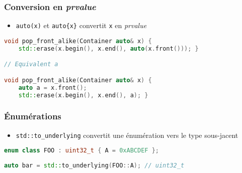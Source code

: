 \documentclass[C++.tex]{subfiles}
\begin{document}
\begin{frame}[fragile]
	\frametitle{Conversion en \textit{prvalue}}


	\begin{itemize}
		\item \lstinline|auto(x)| et \lstinline|auto{x}| convertit \lstinline|x| en \textit{prvalue}


	\end{itemize}

	\begin{lstlisting}[language=C++]
void pop_front_alike(Container auto& x) {
	std::erase(x.begin(), x.end(), auto(x.front())); }

// Equivalent a 

void pop_front_alike(Container auto& x) {
	auto a = x.front();
	std::erase(x.begin(), x.end(), a); }\end{lstlisting}
\end{frame}

\begin{frame}[fragile]
	\frametitle{Énumérations}
	\begin{itemize}
		\item \lstinline|std::to_underlying| convertit une énumération vers le type sous-jacent
	\end{itemize}

	\begin{lstlisting}[language=C++]
enum class FOO : uint32_t { A = 0xABCDEF };
		
auto bar = std::to_underlying(FOO::A); // uint32_t\end{lstlisting}
\end{frame}
\end{document}
